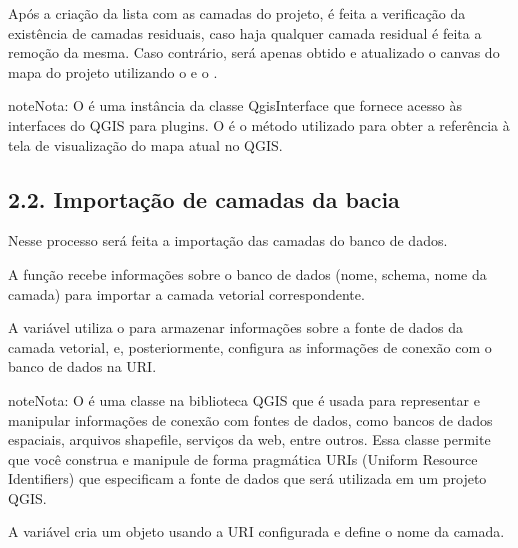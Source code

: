 \documentclass[a4paper,10pt,brazil]{sphinxmanual}
\begin{document}
\sphinxAtStartPar
Após a criação da lista com as camadas do projeto, é feita a verificação da existência de camadas residuais, caso haja qualquer camada residual é feita a remoção da mesma. Caso contrário, será apenas obtido e atualizado o canvas do mapa do projeto utilizando o  e o .

\begin{sphinxadmonition}{note}{Nota:}
\sphinxAtStartPar
O  é uma instância da classe QgisInterface que fornece acesso às interfaces do QGIS para plugins. O  é o método utilizado para obter a referência à tela de visualização do mapa atual no QGIS.
\end{sphinxadmonition}


\subsection{2.2. Importação de camadas da bacia}
\label{\detokenize{2inicializacaoMapa:importacao-de-camadas-da-bacia}}
\sphinxAtStartPar
Nesse processo será feita a importação das camadas do banco de dados.

\sphinxAtStartPar
A função  recebe informações sobre o banco de dados (nome, schema, nome da camada) para importar a camada vetorial correspondente.

\sphinxAtStartPar
A variável  utiliza o  para armazenar informações sobre a fonte de dados da camada vetorial, e, posteriormente, configura as informações de conexão com o banco de dados na URI.

\begin{sphinxadmonition}{note}{Nota:}
\sphinxAtStartPar
O  é uma classe na biblioteca QGIS que é usada para representar e manipular informações de conexão com fontes de dados, como bancos de dados espaciais, arquivos shapefile, serviços da web, entre outros. Essa classe permite que você construa e manipule de forma pragmática URIs (Uniform Resource Identifiers) que especificam a fonte de dados que será utilizada em um projeto QGIS.
\end{sphinxadmonition}

\sphinxAtStartPar
A variável  cria um objeto  usando a URI configurada e define o nome da camada.
\end{document}

